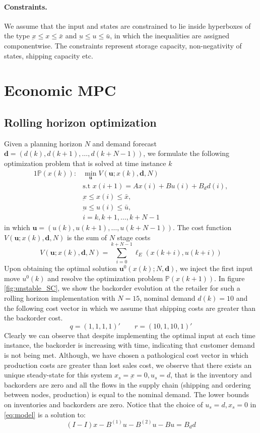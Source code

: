 \documentclass[10pt]{article}
\newcommand{\bu}{\mathbf{u}}
\newcommand{\bd}{\mathbf{d}}
\theoremstyle{definition}
\begin{document}
\paragraph{Constraints.} We assume that the input and states are
constrained to lie inside hyperboxes of the type $\underbar{x} \leq x
\leq \bar{x}$ and $\underbar{u} \leq u \leq \bar{u}$, in which the
inequalities are assigned componentwise. The constraints represent
storage capacity, non-negativity of states, shipping capacity etc.

\section{Economic MPC}
\label{sec:economicMPC}
\subsection{Rolling horizon optimization}
Given a planning horizon $N$ and demand forecast $\bd =
(d(k),d(k+1),\ldots,d(k+N-1))$, we formulate the following
optimization problem that is solved at time instance $k$
\begin{alignat}{1}
\label{eq:P}
\mathbb{P}(x(k)):& \min_{\bu}{V(\bu;x(k),\bd,N)} \nonumber \\
&\text{s.t~} x(i+1) = Ax(i) + Bu(i)+B_dd(i), \nonumber\\
&\underbar{x} \leq x(i) \leq \bar{x},  \\
&\underbar{u} \leq u(i) \leq \bar{u}, \nonumber \\
&i = k,k+1,\ldots,k+N-1\nonumber
\end{alignat}
in which $\bu = (u(k),u(k+1),\ldots,u(k+N-1))$. The cost function
$V(\bu;x(k),\bd,N)$ is the sum of $N$ stage costs
\[V(\bu;x(k),\bd,N) =  \sum_{i=0}^{k+N-1}
  \ell_E(x(k+i),u(k+i))\]
Upon obtaining the optimal solution $\bu^0(x(k);N,\bd)$, we inject the first input move
$u^0(k)$ and resolve the optimization problem
$\mathbb{P}(x(k+1))$. In figure \ref{fig:unstable_SC}, we show the
backorder evolution at the retailer for such a rolling horizon
implementation with  $N=15$, nominal demand $d(k)=10$ and the
following cost vector in which we assume that shipping costs are
greater than the backorder cost.
\[ q = (1,1,1,1)' \qquad r = (10,1,10,1)' \]
Clearly we can observe that despite implementing the optimal input at
each time instance, the backorder is increasing with time, indicating
that customer demand is not being met. Although, we have chosen a
pathological cost vector in which production costs are greater than
lost sales cost, we observe that there exists an unique steady-state
for this system $x_s = \underbar{x}=0, u_s = d$, that is the inventory
and backorders are zero and all the flows in the supply chain
(shipping and ordering between nodes, production) is equal to the
nominal demand.  The lower bounds on inventories and backorders are
zero. Notice that the choice of $u_s = d, x_s=0$ in \eqref{eq:model}
is a solution to:
\[ (I-I)x - B^{(1)}u-B^{(2)}u- Bu = B_dd \] 
\end{document}
